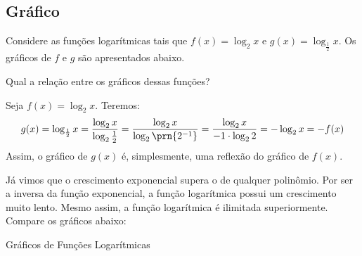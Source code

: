 \subsection{Gráfico}

\begin{example}
    Considere as funções logarítmicas tais que $f(x) = \log_2 x$ e $g(x)
= \log_{\frac 1 2} x$. Os gráficos de $f$ e $g$ são apresentados
abaixo.

Qual a relação entre os gráficos dessas funções?
\end{example}

\begin{solution}
    Seja $f(x) = \log_2 x$. Teremos:
    \[
        g(x) = \log_{\frac 1 2}{x} = \frac{\log_2 x}{\log_2 {\frac 1 2}} = \frac{\log_2 x}{\log_2 \prn{2^{-1}}}
        = \frac{\log_2 x}{-1\cdot\log_2 2} = -\log_2 x = -f(x)
    \]
    Assim, o gráfico de $g(x)$ é, simplesmente, uma reflexão do gráfico de $f(x)$.
\end{solution}

\begin{remark}
    Já vimos que o crescimento exponencial supera o de qualquer
polinômio. Por ser a inversa da função exponencial, a função
logarítmica possui um crescimento muito lento. Mesmo assim, a função
logarítmica é ilimitada superiormente. Compare os gráficos abaixo:
\end{remark}

\begin{onlineact}
    {Gráficos de Funções Logarítmicas}
\end{onlineact}